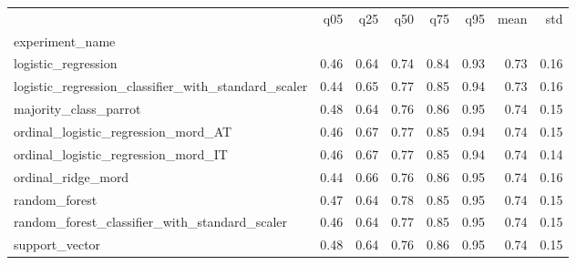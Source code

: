 \begin{tabular}{lrrrrrrr}
\toprule
 & q05 & q25 & q50 & q75 & q95 & mean & std \\
experiment_name &  &  &  &  &  &  &  \\
\midrule
logistic_regression & 0.46 & 0.64 & 0.74 & 0.84 & 0.93 & 0.73 & 0.16 \\
logistic_regression_classifier_with_standard_scaler & 0.44 & 0.65 & 0.77 & 0.85 & 0.94 & 0.73 & 0.16 \\
majority_class_parrot & 0.48 & 0.64 & 0.76 & 0.86 & 0.95 & 0.74 & 0.15 \\
ordinal_logistic_regression_mord_AT & 0.46 & 0.67 & 0.77 & 0.85 & 0.94 & 0.74 & 0.15 \\
ordinal_logistic_regression_mord_IT & 0.46 & 0.67 & 0.77 & 0.85 & 0.94 & 0.74 & 0.14 \\
ordinal_ridge_mord & 0.44 & 0.66 & 0.76 & 0.86 & 0.95 & 0.74 & 0.16 \\
random_forest & 0.47 & 0.64 & 0.78 & 0.85 & 0.95 & 0.74 & 0.15 \\
random_forest_classifier_with_standard_scaler & 0.46 & 0.64 & 0.77 & 0.85 & 0.95 & 0.74 & 0.15 \\
support_vector & 0.48 & 0.64 & 0.76 & 0.86 & 0.95 & 0.74 & 0.15 \\
\bottomrule
\end{tabular}
